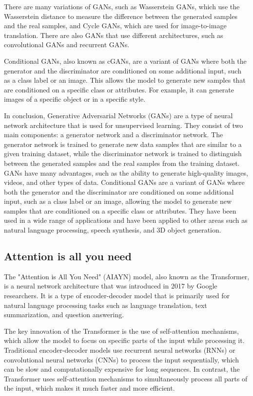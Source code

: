 There are many variations of GANs, such as Wasserstein GANs, which use the Wasserstein distance to measure the difference between the generated samples and the real samples, and Cycle GANs, which are used for image-to-image translation.
There are also GANs that use different architectures, such as convolutional GANs and recurrent GANs.

Conditional GANs, also known as cGANs, are a variant of GANs where both the generator and the discriminator are conditioned on some additional input, such as a class label or an image.
This allows the model to generate new samples that are conditioned on a specific class or attributes.
For example, it can generate images of a specific object or in a specific style.

In conclusion, Generative Adversarial Networks (GANs) are a type of neural network architecture that is used for unsupervised learning.
They consist of two main components: a generator network and a discriminator network.
The generator network is trained to generate new data samples that are similar to a given training dataset, while the discriminator network is trained to distinguish between the generated samples and the real samples from the training dataset.
GANs have many advantages, such as the ability to generate high-quality images, videos, and other types of data.
Conditional GANs are a variant of GANs where both the generator and the discriminator are conditioned on some additional input, such as a class label or an image, allowing the model to generate new samples that are conditioned on a specific class or attributes.
They have been used in a wide range of applications and have been applied to other areas such as natural language processing, speech synthesis, and 3D object generation.

\subsection{Attention is all you need}

The "Attention is All You Need" (AIAYN) \cite{vaswani} model, also known as the Transformer, is a neural network architecture that was introduced in 2017 by Google researchers.
It is a type of encoder-decoder model that is primarily used for natural language processing tasks such as language translation, text summarization, and question answering.

The key innovation of the Transformer is the use of self-attention mechanisms, which allow the model to focus on specific parts of the input while processing it.
Traditional encoder-decoder models use recurrent neural networks (RNNs) or convolutional neural networks (CNNs) to process the input sequentially, which can be slow and computationally expensive for long sequences.
In contrast, the Transformer uses self-attention mechanisms to simultaneously process all parts of the input, which makes it much faster and more efficient.

